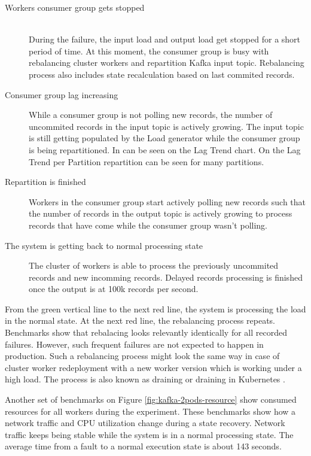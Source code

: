 \begin{description}
    \item[Workers consumer group gets stopped] \\
    During the failure, the input load and output load get stopped for a short period of time.
    At this moment, the consumer group is busy with rebalancing cluster workers and repartition
    Kafka input topic.
    Rebalancing process also includes state recalculation based on last commited records.
    \item[Consumer group lag increasing] While a consumer group is not polling new records,
    the number of uncommited records in the input topic is actively growing.
    The input topic is still getting populated by the Load generator while the consumer group
    is being repartitioned.
    In can be seen on the Lag Trend chart.
    On the Lag Trend per Partition repartition can be seen for many partitions.
    \item[Repartition is finished] Workers in the consumer group start actively polling new records
    such that the number of records in the output topic is actively growing to process
    records that have come while the consumer group wasn't polling.
    \item[The system is getting back to normal processing state]
    The cluster of workers is able to process the previously uncommited records and new incomming
    records.
    Delayed records processing is finished once the output is at 100k records per second.
\end{description}

From the green vertical line to the next red line, the system is processing the load in the
normal state.
At the next red line, the rebalancing process repeats.
Benchmarks show that rebalacing looks relevantly identically for all recorded failures.
However, such frequent failures are not expected to happen in production.
Such a rebalancing process might look the same way in case of cluster worker redeployment with a new
worker version which is working under a high load.
The process is also known as draining or draining in Kubernetes \cite{kubernetes_intro}.

Another set of benchmarks on Figure \ref{fig:kafka-2pods-resource} show consumed resources for all workers during the experiment.
These benchmarks show how a network traffic and CPU utilization change during a state recovery.
Network traffic keeps being stable while the system is in a normal processing state.
The average time from a fault to a normal execution state is about 143 seconds.


